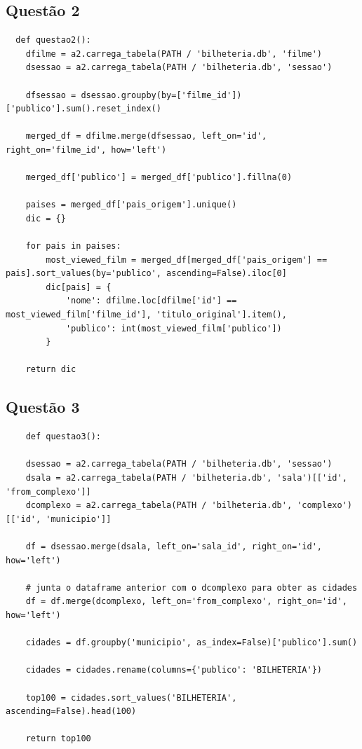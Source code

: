 \documentclass{article}
\begin{document}
\subsection*{Questão 2}

\begin{lstlisting}
  def questao2():
    dfilme = a2.carrega_tabela(PATH / 'bilheteria.db', 'filme')
    dsessao = a2.carrega_tabela(PATH / 'bilheteria.db', 'sessao')
    
    dfsessao = dsessao.groupby(by=['filme_id'])['publico'].sum().reset_index()
    
    merged_df = dfilme.merge(dfsessao, left_on='id', right_on='filme_id', how='left')
    
    merged_df['publico'] = merged_df['publico'].fillna(0)
    
    paises = merged_df['pais_origem'].unique()
    dic = {}
    
    for pais in paises:
        most_viewed_film = merged_df[merged_df['pais_origem'] == pais].sort_values(by='publico', ascending=False).iloc[0]
        dic[pais] = {
            'nome': dfilme.loc[dfilme['id'] == most_viewed_film['filme_id'], 'titulo_original'].item(),
            'publico': int(most_viewed_film['publico'])
        }
    
    return dic
\end{lstlisting}
\subsection*{Questão 3}


\begin{lstlisting}
    def questao3():
    
    dsessao = a2.carrega_tabela(PATH / 'bilheteria.db', 'sessao')
    dsala = a2.carrega_tabela(PATH / 'bilheteria.db', 'sala')[['id', 'from_complexo']]
    dcomplexo = a2.carrega_tabela(PATH / 'bilheteria.db', 'complexo')[['id', 'municipio']]

    df = dsessao.merge(dsala, left_on='sala_id', right_on='id', how='left')

    # junta o dataframe anterior com o dcomplexo para obter as cidades
    df = df.merge(dcomplexo, left_on='from_complexo', right_on='id', how='left')

    cidades = df.groupby('municipio', as_index=False)['publico'].sum()

    cidades = cidades.rename(columns={'publico': 'BILHETERIA'})

    top100 = cidades.sort_values('BILHETERIA', ascending=False).head(100)

    return top100
\end{lstlisting}
\end{document}
